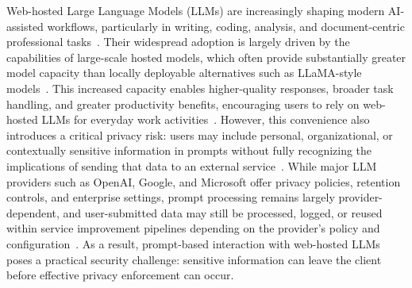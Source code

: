 \documentclass[conference]{IEEEtran}
\begin{document}
Web-hosted Large Language Models (LLMs) are increasingly shaping modern AI-assisted workflows, particularly in writing, coding, analysis, and document-centric professional tasks~\cite{Gupta2024, LIANG2025101366, koraag2025comparing}. Their widespread adoption is largely driven by the capabilities of large-scale hosted models, which often provide substantially greater model capacity than locally deployable alternatives such as LLaMA-style models~\cite{Florian2025, MEDEC2024}. This increased capacity enables higher-quality responses, broader task handling, and greater productivity benefits, encouraging users to rely on web-hosted LLMs for everyday work activities~\cite{Crane2025, Zahra2025}. However, this convenience also introduces a critical privacy risk: users may include personal, organizational, or contextually sensitive information in prompts without fully recognizing the implications of sending that data to an external service~\cite{Athey2017}. While major LLM providers such as OpenAI, Google, and Microsoft offer privacy policies, retention controls, and enterprise settings, prompt processing remains largely provider-dependent, and user-submitted data may still be processed, logged, or reused within service improvement pipelines depending on the provider’s policy and configuration~\cite{barbera2025ai,King2025}. As a result, prompt-based interaction with web-hosted LLMs poses a practical security challenge: sensitive information can leave the client before effective privacy enforcement can occur.
\end{document}
